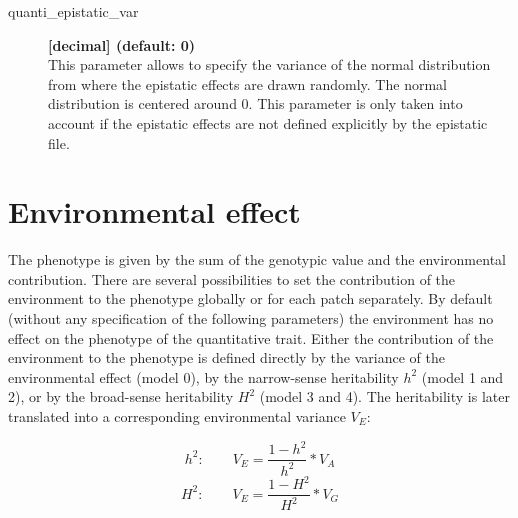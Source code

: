 \documentclass[letterpaper,12pt,oneside]{book}
\begin{document}
\begin{description}
\item[quanti\_epistatic\_var] \textbf{[decimal] (default: 0)} \\
This parameter allows to specify the variance of the normal distribution from where the epistatic effects are drawn randomly. The normal distribution is centered around 0. This parameter is only taken into account if the epistatic effects are not defined explicitly by the epistatic file.
\end{description}
\section{Environmental effect}

The phenotype is given by the sum of the genotypic value and the environmental contribution. There are several possibilities to set the contribution of the environment to the phenotype globally or for each patch separately. By default (without any specification of the following parameters) the environment has no effect on the phenotype of the quantitative trait. Either the contribution of the environment to the phenotype is defined directly by the variance of the environmental effect (model 0), by the narrow-sense heritability $h^{2}$ (model 1 and 2), or by the broad-sense heritability $H^{2}$ (model 3 and 4). The heritability is later translated into a corresponding environmental variance $V_{E}$: 

\[h^{2}: \qquad V_{E} = \frac{1-h^{2}}{h^{2}}*V_{A}\]
\[H^{2}: \qquad V_{E} = \frac{1-H^{2}}{H^{2}}*V_{G}\]
\end{document}

